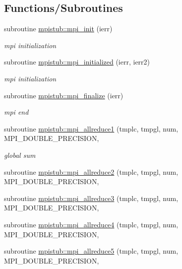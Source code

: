 \subsection*{Functions/\+Subroutines}
\begin{DoxyCompactItemize}
\item 
subroutine \mbox{\hyperlink{namespacempistub_af6819ee02570b8c8bef94e79e67a4af9}{mpistub\+::mpi\+\_\+init}} (ierr)
\begin{DoxyCompactList}\small\item\em mpi initialization \end{DoxyCompactList}\item 
subroutine \mbox{\hyperlink{namespacempistub_aa720efd8024be5bb417f89dfd1b02c9d}{mpistub\+::mpi\+\_\+initialized}} (ierr, ierr2)
\begin{DoxyCompactList}\small\item\em mpi initialization \end{DoxyCompactList}\item 
subroutine \mbox{\hyperlink{namespacempistub_a6a6bc8ca0a832b3f53660407ed51302d}{mpistub\+::mpi\+\_\+finalize}} (ierr)
\begin{DoxyCompactList}\small\item\em mpi end \end{DoxyCompactList}\item 
subroutine \mbox{\hyperlink{namespacempistub_a500688889ac1b249a828fab59a1f8b5e}{mpistub\+::mpi\+\_\+allreduce1}} (tmplc, tmpgl, num, M\+P\+I\+\_\+\+D\+O\+U\+B\+L\+E\+\_\+\+P\+R\+E\+C\+I\+S\+I\+ON,
\begin{DoxyCompactList}\small\item\em global sum \end{DoxyCompactList}\item 
subroutine \mbox{\hyperlink{namespacempistub_a8d115cae5e65c2a2bc7679f25da7b08a}{mpistub\+::mpi\+\_\+allreduce2}} (tmplc, tmpgl, num, M\+P\+I\+\_\+\+D\+O\+U\+B\+L\+E\+\_\+\+P\+R\+E\+C\+I\+S\+I\+ON,
\item 
subroutine \mbox{\hyperlink{namespacempistub_a4193e72879e62788a983d1c7e73ff08c}{mpistub\+::mpi\+\_\+allreduce3}} (tmplc, tmpgl, num, M\+P\+I\+\_\+\+D\+O\+U\+B\+L\+E\+\_\+\+P\+R\+E\+C\+I\+S\+I\+ON,
\item 
subroutine \mbox{\hyperlink{namespacempistub_ad0b3b8a56320b07ec24fdf1a6d012614}{mpistub\+::mpi\+\_\+allreduce4}} (tmplc, tmpgl, num, M\+P\+I\+\_\+\+D\+O\+U\+B\+L\+E\+\_\+\+P\+R\+E\+C\+I\+S\+I\+ON,
\item 
subroutine \mbox{\hyperlink{namespacempistub_a1d326fcb72261d5c91c9f31bfdeae961}{mpistub\+::mpi\+\_\+allreduce5}} (tmplc, tmpgl, num, M\+P\+I\+\_\+\+D\+O\+U\+B\+L\+E\+\_\+\+P\+R\+E\+C\+I\+S\+I\+ON,

\end{DoxyCompactItemize}
